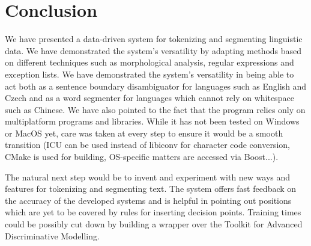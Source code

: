 \chapter*{Conclusion}

We have presented a data-driven system for tokenizing and segmenting linguistic
data. We have demonstrated the system's versatility by adapting methods based
on different techniques such as morphological analysis, regular expressions and
exception lists. We have demonstrated the system's versatility in being able to
act both as a sentence boundary disambiguator for languages such as English and
Czech and as a word segmenter for languages which cannot rely on whitespace
such as Chinese. We have also pointed to the fact that the program relies only
on multiplatform programs and libraries. While it has not been tested on
Windows or MacOS yet, care was taken at every step to ensure it would be a
smooth transition (ICU can be used instead of libiconv for character code
conversion, CMake is used for building, OS-specific matters are accessed via
Boost...).

The natural next step would be to invent and experiment with new ways and
features for tokenizing and segmenting text. The system offers fast feedback on
the accuracy of the developed systems and is helpful in pointing out positions
which are yet to be covered by rules for inserting decision points. Training
times could be possibly cut down by building a wrapper over the Toolkit for
Advanced Discriminative Modelling.
